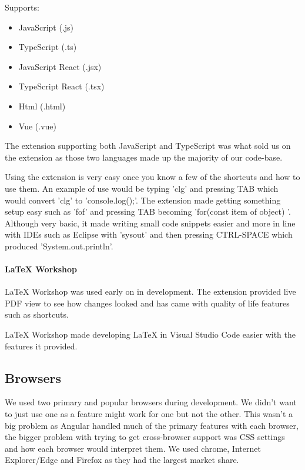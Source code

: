 Supports:
\begin{itemize}
    \item JavaScript (.js)
    \item TypeScript (.ts)
    \item JavaScript React (.jsx)
    \item TypeScript React (.tsx)
    \item Html (.html)
    \item Vue (.vue)
\end{itemize}

The extension supporting both JavaScript and TypeScript was what sold us on the extension as those two languages made up the majority of our code-base. 

Using the extension is very easy once you know a few of the shortcuts and how to use them. An example of use would be typing 'clg' and pressing TAB which would convert 'clg' to 'console.log();'. The extension made getting something setup easy such as 'fof' and pressing TAB becoming 'for(const item of object) {}'. Although very basic, it made writing small code snippets easier and more in line with IDEs such as Eclipse with 'sysout' and then pressing CTRL-SPACE which produced 'System.out.println'.

\paragraph{LaTeX Workshop}
LaTeX Workshop was used early on in development. The extension provided live PDF view to see how changes looked and has came with quality of life features such as shortcuts.

LaTeX Workshop made developing LaTeX in Visual Studio Code easier with the features it provided.

\subsection{Browsers}
We used two primary and popular browsers during development. We didn't want to just use one as a feature might work for one but not the other. This wasn't a big problem as Angular handled much of the primary features with each browser, the bigger problem with trying to get cross-browser support was CSS settings and how each browser would interpret them. We used chrome, Internet Explorer/Edge and Firefox as they had the largest market share.